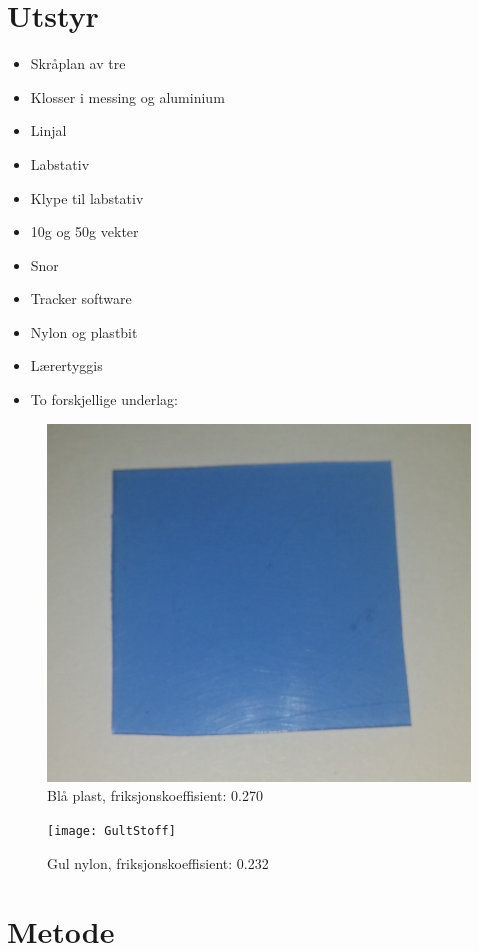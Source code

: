 \documentclass[10pt,a4paper]{report}
\begin{document}
\section*{Utstyr}
\begin{itemize}
\item Skråplan av tre
\item Klosser i messing og aluminium
\item Linjal
\item Labstativ
\item Klype til labstativ
\item 10g og 50g vekter
\item Snor
\item Tracker software
\item Nylon og plastbit
\item Lærertyggis
\item To forskjellige underlag:
\end{itemize}

\begin{figure}[h!]
    \includegraphics[scale=0.05]{BlaaPlast}
    \caption{Blå plast, friksjonskoeffisient: 0.270}
    \label{fig:1}
\end{figure}
\begin{figure}[h!]
    \texttt{[image: GultStoff]}
    \caption{Gul nylon, friksjonskoeffisient: 0.232}
    \label{fig:2}
\end{figure}

\section*{Metode}
\end{document}
